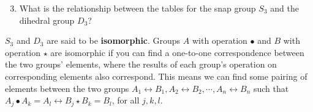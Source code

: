 \documentclass[../textbook.tex]{subfiles}
\begin{document}
\begin{enumerate}
\setcounter{enumi}{2}%
\item What is the relationship between the tables for the snap group $S_3$ and the dihedral group $D_3$?
\setcounter{enumLast}{\theenumi}
\end{enumerate}
$S_3$ and $D_3$ are said to be \textbf{isomorphic}. Groups $A$ with operation $\bullet$ and $B$ with operation $\star$ are isomorphic if you can find a one-to-one correspondence between the two groups' elements, where the results of each group's operation on corresponding elements also correspond. This means we can find some pairing of elements between the two groups $A_1\leftrightarrow B_1, A_2\leftrightarrow B_2, \cdots, A_n \leftrightarrow B_n$ such that $A_j \bullet A_k = A_l \leftrightarrow B_j \star B_k = B_l$, for all $j,k,l$.
\end{document}
